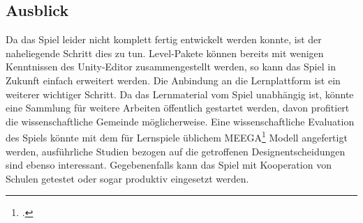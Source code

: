 \subsection{Ausblick}
	Da das Spiel leider nicht komplett fertig entwickelt werden konnte, ist der naheliegende Schritt dies zu tun. Level-Pakete können bereits mit wenigen Kenntnissen des Unity-Editor zusammengestellt werden, so kann das Spiel in Zukunft einfach erweitert werden. Die Anbindung an die Lernplattform ist ein weiterer wichtiger Schritt.
	Da das Lernmaterial vom Spiel unabhängig ist, könnte eine Sammlung für weitere Arbeiten öffentlich gestartet werden, davon profitiert die wissenschaftliche Gemeinde möglicherweise.
	Eine wissenschaftliche Evaluation des Spiels könnte mit dem für Lernspiele üblichem MEEGA\footcite{psych1} Modell angefertigt werden, ausführliche Studien bezogen auf die getroffenen Designentscheidungen sind ebenso interessant.
	Gegebenenfalls kann das Spiel mit Kooperation von Schulen getestet oder sogar produktiv eingesetzt werden.
